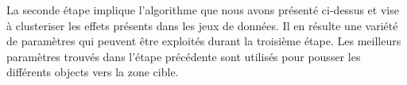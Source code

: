 \documentclass{llncs}
\begin{document}



La seconde étape implique l'algorithme que nous avons présenté ci-dessus et vise à clusteriser les effets présents dans les jeux de données. Il en résulte une variété de paramètres qui peuvent être exploités durant la troisième étape.
Les meilleurs paramètres trouvés dans l'étape précédente sont utilisés pour pousser les différents objects vers la zone cible.

\end{document}
